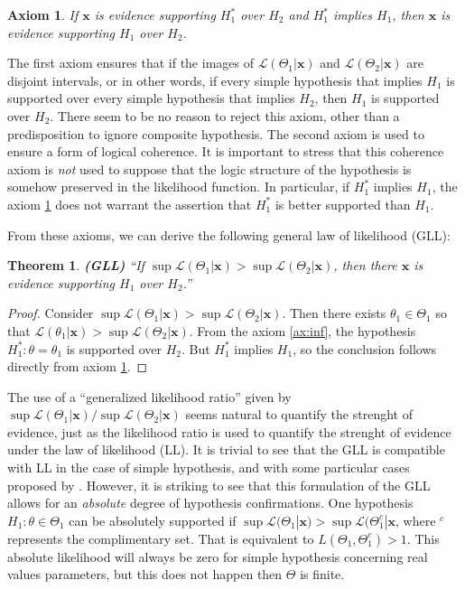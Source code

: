 \documentclass[twoside,12pt,a4paper]{article}
\newtheorem{axiom}{Axiom}[section]
\newtheorem*{theorem}{Theorem}
\newcommand{\bu}[1]{\mbox{$\mathbf{#1}$}}
\begin{document}
\begin{axiom}
	If $\bu{x}$ is evidence supporting $H_1^*$ over $H_2$ and $H_1^*$ implies $H_1$, then 
  $\bu{x}$ is evidence supporting $H_1$ over $H_2$.\label{ax:coh}
\end{axiom}

The first axiom ensures that if the images of $\mathcal{L} (\Theta_1|\bu{x})$ and 
$\mathcal{L} (\Theta_2|\bu{x})$ are disjoint intervals, or in other words, if every simple hypothesis
that implies $H_1$ is supported over every simple hypothesis that implies $H_2$, then $H_1$ is supported
over $H_2$. There seem to be no reason to reject this axiom, other than a predisposition to ignore composite
hypothesis. The second axiom is used to ensure a form of logical coherence. It is important to stress that
this coherence axiom is {\em not} used to suppose that the logic structure of the hypothesis is somehow
preserved in the likelihood function. In particular, if $H_1^*$ implies $H_1$, the axiom \ref{ax:coh} does
not warrant the assertion that $H_1^*$ is better supported than $H_1$.

From these axioms, we can derive the following general law of likelihood (GLL):

\begin{theorem}
	\textbf{(GLL)} ``If $\sup \mathcal{L} (\Theta_1 | \bu{x} ) > \sup \mathcal{L} (\Theta_2 | \bu{x})$, then
  there $\bu{x}$ is evidence supporting $H_1$ over $H_2$.'' \citep{Zhang09}
\end{theorem}

\begin{proof}
	Consider $\sup \mathcal{L} (\Theta_1 | \bu{x} ) > \sup \mathcal{L} (\Theta_2 | \bu{x})$. 
  Then there exists $\theta_1 \in \Theta_1$
	so that $\mathcal{L} (\theta_1 | \bu{x}) > \sup \mathcal{L} (\Theta_2 | \bu{x})$. 
  From the axiom \ref{ax:inf}, the hypothesis
	$H_1^* : \theta = \theta_1$ is supported over $H_2$. But $H_1^*$ implies $H_1$, so the conclusion
  follows directly from axiom \ref{ax:coh}.
\end{proof}

The use of a ``generalized likelihood ratio'' given by $\sup \mathcal{L}(\Theta_1 | \bu{x}) / 
\sup \mathcal{L} (\Theta_2 | \bu{x}) $ seems natural to quantify the strenght of evidence, just as the
likelihood ratio is used to quantify the strenght of evidence under the law of likelihood (LL).
It is trivial to see that the GLL is compatible with LL in the case of simple hypothesis, and with some
particular cases proposed by \citep{Royall97}. However, it is striking to see that this formulation of the 
GLL allows for an {\em absolute} degree of hypothesis confirmations. One hypothesis 
$H_1: \theta \in \Theta_1$ can be absolutely supported if $\sup \mathcal{L}(\Theta_1|\bu{x}) > 
\sup \mathcal{L} (\Theta_1^c|\bu{x}$, where $^c$ represents the complimentary set.
That is equivalent to $L(\Theta_1, \Theta_1^c) > 1$. This absolute likelihood will always be zero
for simple hypothesis concerning real values parameters, but this does not happen then $\Theta$ is finite.
\end{document}
